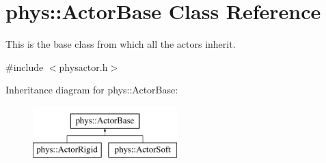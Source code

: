 \hypertarget{classphys_1_1ActorBase}{
\section{phys::ActorBase Class Reference}
\label{d8/d0f/classphys_1_1ActorBase}
}


This is the base class from which all the actors inherit.  




{\ttfamily \#include $<$physactor.h$>$}

Inheritance diagram for phys::ActorBase:\begin{figure}[H]
\begin{center}
\leavevmode
\includegraphics[height=2cm]{d8/d0f/classphys_1_1ActorBase}
\end{center}
\end{figure}
